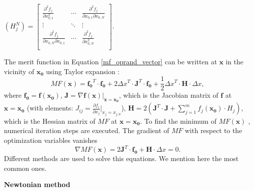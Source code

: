 \medskip
\newline
\begin{center}
$
\left( H^N_{j} \right) = 
\begin{bmatrix}
\frac{\partial^2 f_j}{\partial{x_{0,1}^2}} &    \cdots          & \frac{\partial^2 f_j}{\partial{x_{0,1}\partial{x_{0,N}}}}    \\
       \vdots                   &     \ddots            & \vdots \\
\frac{\partial^2 f_j}{\partial{x_{0,N}\partial{x_{0,1}}}}     & \cdots           & \frac{\partial^2 f_j}{\partial{x_{0,N}^2}} \\
\end{bmatrix}
$.
\end{center}
\medskip
The merit function in Equation \ref{mf_oprand_vector} can be written at $\pmb{x}$ in the vicinity of $\pmb{x_0}$ using Taylor expansion :
\begin{equation} \label{mf_expanded}
MF(\pmb{x}) = \pmb{f_{0}}^{T} \cdot \pmb{f_{0}} + 2 \Delta x^{T} \cdot \pmb{J}^{T} \cdot \pmb{f_{0}} + \frac{1}{2} \Delta x^{T} \cdot \pmb{H} \cdot \Delta x,
\end{equation}where $\pmb{f_0} = \pmb{f}(\pmb{x_0})$, $\pmb{J} = \nabla \pmb{f}(\pmb{x})\vert _{\pmb{x} = \pmb{x_0}}$, which is the Jacobian matrix of $\pmb{f}$ at $ \pmb{x} = \pmb{x_0} $ (with elements: $J_{ij} = \frac{\partial{f_i}}{\partial {x_j}} \vert _{x_j = x_{j,0}}$), $\pmb{H} = 2 \left( \pmb{J}^T \cdot \pmb{J} + \sum_{j=1}^{m} f_j(\pmb{x_0}) \cdot H_j \right) $, which is the Hessian matrix of $MF$ at $ \pmb{x} = \pmb{x_0} $. 
To find the minimum of $MF(\pmb{x})$ , numerical iteration steps are executed. The gradient of $MF$ with respect to the optimization variables vanishes
\begin{equation}\label{eq: MF_grad_zero}
\nabla MF(\pmb{x}) = 2 \pmb{J}^{T} \cdot \pmb{f_0} + \pmb{H} \cdot \Delta x = 0.
\end{equation}Different methods are used to solve this equations. We mention here the most common ones. 
\newline

\textbf{Newtonian method}

